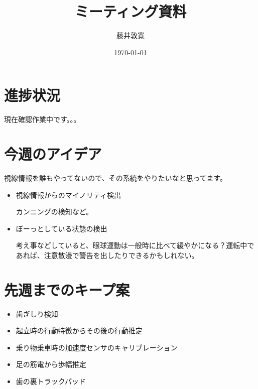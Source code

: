 \documentclass[a4j,twocolumn,10pt]{jarticle}
\title{ミーティング資料}
\author{藤井敦寛}
\date{\today}
\begin{document}
\maketitle

\section{進捗状況}
現在確認作業中です。。。

\section{今週のアイデア}
視線情報を誰もやってないので、その系統をやりたいなと思ってます。
\begin{itemize}
  \item 視線情報からのマイノリティ検出

  カンニングの検知など。

  \item ぼーっとしている状態の検出

  考え事などしていると、眼球運動は一般時に比べて緩やかになる？運転中であれば、注意散漫で警告を出したりできるかもしれない。
\end{itemize}

\section{先週までのキープ案}
\begin{itemize}
  \item 歯ぎしり検知
  \item 起立時の行動特徴からその後の行動推定
  \item 乗り物乗車時の加速度センサのキャリブレーション
  \item 足の筋電から歩幅推定
  \item 歯の裏トラックパッド
\end{itemize}
\end{document}
